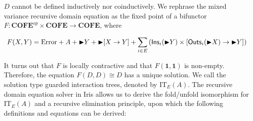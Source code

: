 \documentclass{article}
\theoremstyle{definition}
\theoremstyle{plain}
\theoremstyle{remark}
\newcommand{\Error}{\mathrm{Error}}
\newcommand{\Ins}{\mathsf{Ins}}
\newcommand{\Outs}{\mathsf{Outs}}
\newcommand{\COFE}{\mathbf{COFE}}
\newcommand{\IT}{\mathrm{IT}}
\begin{document}
\(D\) cannot be defined inductively nor coinductively.
We rephrase the mixed variance recursive domain equation as the fixed point of a bifunctor \(F : \COFE^{op} \times \COFE \to \COFE\), where

\[
  F(X,Y) = \Error + A + \latert Y + \latert [X \to Y] + \sum_{i\in E} \left( \Ins_i(\latert Y) \times [\Outs_i(\latert X) \to \latert Y] \right)
\]

It turns out that \(F\) is locally contractive and that \(F(\mathbf{1}, \mathbf{1})\) is non-empty.
Therefore, the equation \(F(D,D) \cong D\) has a unique solution.
We call the solution type guarded interaction trees, denoted by \(\IT_E(A)\).
The recursive domain equation solver in Iris allows us to derive the fold/unfold isomorphism for \(\IT_E(A)\) and a recursive elimination principle,
upon which the following definitions and equations can be derived:
\end{document}
